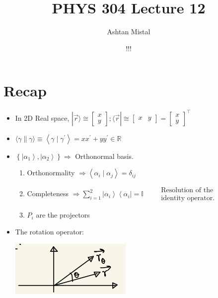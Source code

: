 \documentclass{article}
\title{PHYS 304 Lecture 12}
\author{Ashtan Mistal}
\date{!!!}
\begin{document}
\ifstandalone
\maketitle
\fi

\graphicspath{{./Lecture12/}}


\section{Recap}


\begin{itemize}
    \item In 2D Real space, $|\vec{r}\rangle \cong\left[\begin{array}{l}x \\ y\end{array}\right] ;\langle\vec{r}| \cong\left[\begin{array}{ll}x & y\end{array}\right]=\left[\begin{array}{l}x \\ y\end{array}\right]^{\top}$
    
    \item $\langle\gamma \| \gamma\rangle \equiv\left\langle\gamma \mid \gamma^{\prime}\right\rangle=x x^{\prime}+y y^{\prime} \in \mathbb{R}$
    
    \item $\left\{\left|\alpha_{1}\right\rangle,\left|\alpha_{2}\right\rangle\right\} \Rightarrow$ Orthonormal basis.
    \begin{enumerate}
        \item Orthonormality $\Rightarrow\left\langle\alpha_{i} \mid \alpha_{j}\right\rangle=\delta_{i j}$
        
        \item Completeness $\Rightarrow \sum_{i=1}^{2}\left|\alpha_{i}\right\rangle\left\langle\alpha_{i}\right|=\mathbb{I} \quad \begin{aligned}&\text { Resolution of the } \\&\text { identity operator. }\end{aligned}$
        
        \item $P_i$ are the projectors
    \end{enumerate}
    
    \item The rotation operator:

\includegraphics[width = 0.3 \textwidth]{Lecture12/1.png}


\end{itemize}
\end{document}
